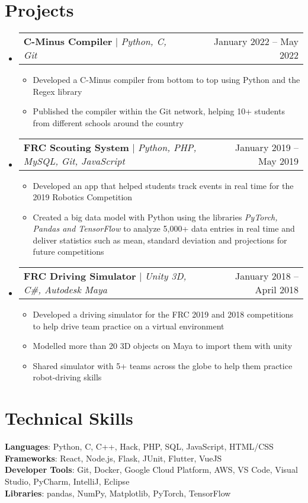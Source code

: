 \documentclass[letterpaper,11pt]{article}
\makeatletter
\newcommand{\resumeItem}[1]{
  \item\small{
    {#1 \vspace{-2pt}}
  }
}
\newcommand{\resumeProjectHeading}[2]{
    \item
    \begin{tabular*}{0.97\textwidth}{l@{\extracolsep{\fill}}r}
      \small#1 & #2 \\
    \end{tabular*}\vspace{-7pt}
}
\newcommand{\resumeSubHeadingListStart}{\begin{itemize}[leftmargin=0.15in, label={}]}
\newcommand{\resumeSubHeadingListEnd}{\end{itemize}}
\newcommand{\resumeItemListStart}{\begin{itemize}}
\newcommand{\resumeItemListEnd}{\end{itemize}\vspace{-5pt}}
\makeatother
\begin{document}
\section{Projects}
    \resumeSubHeadingListStart
      \resumeProjectHeading
          {\textbf{C-Minus Compiler} $|$ \emph{Python, C, Git}}{January 2022 -- May 2022}
          \resumeItemListStart
            \resumeItem{Developed a C-Minus compiler from bottom to top using Python and the Regex library}
            \resumeItem{Published the compiler within the Git network, helping 10+ students from different schools around the country}
          \resumeItemListEnd
      \resumeProjectHeading
          {\textbf{FRC Scouting System} $|$ \emph{Python, PHP, MySQL, Git, JavaScript}}{January 2019 -- May 2019}
          \resumeItemListStart
            \resumeItem{Developed an app that helped students track events in real time for the 2019 Robotics Competition}
            \resumeItem{Created a big data model with Python using the libraries \emph{PyTorch, Pandas and TensorFlow} to analyze 5,000+ data entries in real time and deliver statistics such as mean, standard deviation and projections for future competitions}
          \resumeItemListEnd
      \resumeProjectHeading
          {\textbf{FRC Driving Simulator} $|$ \emph{Unity 3D, C\#, Autodesk Maya}}{January 2018 -- April 2018}
          \resumeItemListStart
            \resumeItem{Developed a driving simulator for the FRC 2019 and 2018 competitions to help drive team practice on a virtual environment}
            \resumeItem{Modelled more than 20 3D objects on Maya to import them with unity}
            \resumeItem{Shared simulator with 5+ teams across the globe to help them practice robot-driving skills}
          \resumeItemListEnd
    \resumeSubHeadingListEnd


%
\section{Technical Skills}
 \begin{itemize}[leftmargin=0.15in, label={}]
    \small{\item{
     \textbf{Languages}{: Python, C, C++, Hack, PHP, SQL, JavaScript, HTML/CSS} \\
     \textbf{Frameworks}{: React, Node.js, Flask, JUnit, Flutter, VueJS} \\
     \textbf{Developer Tools}{: Git, Docker, Google Cloud Platform, AWS, VS Code, Visual Studio, PyCharm, IntelliJ, Eclipse} \\
     \textbf{Libraries}{: pandas, NumPy, Matplotlib, PyTorch, TensorFlow}
    }}
 \end{itemize}


\end{document}
